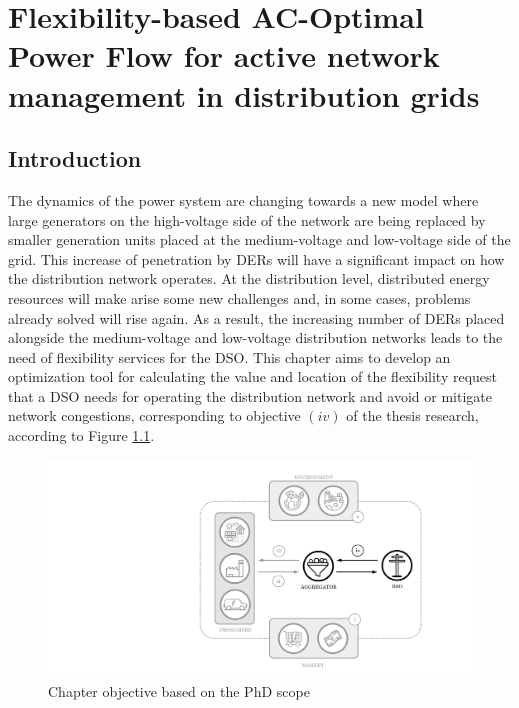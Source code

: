 \chapter{Flexibility-based AC-Optimal Power Flow for active network management in distribution grids}
\label{ChapterOPFDSO}

\section{Introduction}

The dynamics of the power system are changing towards a new model where large generators on the high-voltage side of the network are being replaced by smaller generation units placed at the medium-voltage and low-voltage side of the grid. This increase of penetration by DERs will have a significant impact on how the distribution network operates. At the distribution level, distributed energy resources will make arise some new challenges and, in some cases, problems already solved will rise again. As a result, the increasing number of DERs placed alongside the medium-voltage  and low-voltage distribution networks leads to the need of flexibility services for the DSO. 
This chapter aims to develop an optimization tool for calculating the value and location of the flexibility request that a DSO needs for operating the distribution network and avoid or mitigate network congestions, corresponding to objective $(iv)$ of the thesis research, according to Figure \ref{fig:chapter_obj_iv}. 

\begin{figure}[H]
	\centering
	\includegraphics[width=0.6\columnwidth ]{ChapterOPF_DSO/Figures/phd_intro_iv.pdf}
		\caption{Chapter objective based on the PhD scope}
	\label{fig:chapter_obj_iv}  
\end{figure}

